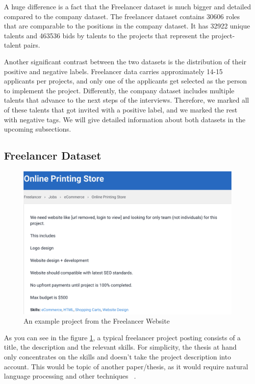 A huge difference is a fact that the Freelancer dataset is much bigger and detailed compared to the company dataset. The freelancer dataset contains 30606 roles that are comparable to the positions in the company dataset. It has 32922 unique talents and 463536 bids by talents to the projects that represent the project-talent pairs.



Another significant contrast between the two datasets is the distribution of their positive and negative labels. Freelancer data carries approximately 14-15 applicants per projects, and only one of the applicants get selected as the person to implement the project. Differently,  the company dataset includes multiple talents that advance to the next steps of the interviews. Therefore, we marked all of these talents that got invited with a positive label, and we marked the rest with negative tags. We will give detailed information about both datasets in the upcoming subsections.


\subsection{Freelancer Dataset}\label{implementation-subsection-freelancer}


\begin{figure}[!ht]
	\centering
	\includegraphics[width=\textwidth]{figures/FreelancerExample.png}
	\caption{An example project from the Freelancer Website}
	\label{fig:freelancer-example-project}
\end{figure}


As you can see in the figure \ref{fig:freelancer-example-project}, a typical freelancer project posting consists of a title, the description and the relevant skills. For simplicity, the thesis at hand only concentrates on the skills and doesn't take the project description into account. This would be topic of another paper/thesis, as it would require natural language processing and other techniques ~\parencite{bird2009natural}.


